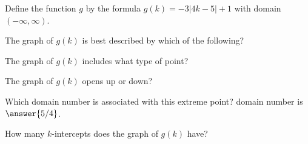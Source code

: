 \documentclass{ximera}
\begin{document}
\begin{definition}
Define the function $g$ by the formula $g(k) = -3|4k-5| + 1$ with domain $(-\infty, \infty)$.

\end{definition}



\begin{exercise}
The graph of $g(k)$ is best described by which of the following?

\begin{multipleChoice}
\end{multipleChoice}

\end{exercise}




\begin{exercise}
The graph of $g(k)$ includes what type of point?

\begin{multipleChoice}
\end{multipleChoice}

\end{exercise}



\begin{exercise}
The graph of $g(k)$ opens up or down?

\begin{multipleChoice}
\end{multipleChoice}

\end{exercise}





\begin{exercise}
Which domain number is associated with this extreme point?
domain number is $\answer{5/4}$.

\end{exercise}









\begin{exercise}
How many $k$-intercepts does the graph of $g(k)$ have?

\begin{multipleChoice}
\end{multipleChoice}

\end{exercise}
\end{document}

